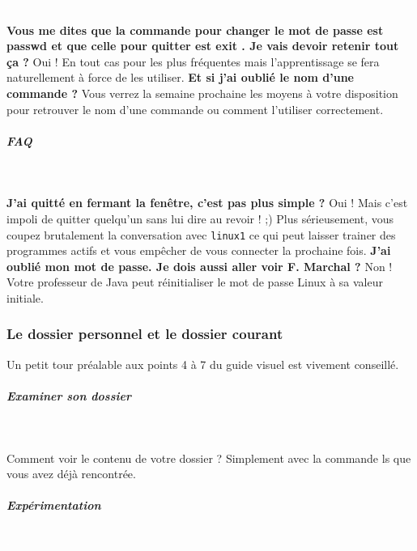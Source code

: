\documentclass[11pt,a4paper]{article}
\begin{document}
					\textcolor{white}{.} \par
				
            \par
         \textbf{Vous me dites que la commande pour changer le mot de passe est passwd  et que celle pour quitter est exit . Je vais devoir retenir tout \c ca ?} 
Oui ! En tout cas pour les plus fr\'equentes mais l'apprentissage se fera naturellement \`a force de les utiliser.
 \textbf{Et si j'ai oubli\'e le nom d'une commande ?} 
Vous verrez la semaine prochaine les moyens \`a votre disposition pour retrouver le nom d'une commande ou comment l'utiliser correctement. 

			
		\subparagraph{FAQ} 
		
					\textcolor{white}{.} \par
				
            \par
         \textbf{J'ai quitt\'e en fermant la fen\^etre, c'est pas plus simple ?} 
Oui ! Mais c'est impoli de quitter quelqu'un sans lui dire au revoir !
;) Plus s\'erieusement, vous coupez brutalement la conversation avec
 \texttt{linux1}  ce qui peut laisser trainer des programmes actifs et vous emp\^echer de
vous connecter la prochaine fois.
 \textbf{J'ai oubli\'e mon mot de passe. Je dois aussi aller voir F. Marchal ?} 
Non ! Votre professeur de Java peut r\'einitialiser le mot de passe Linux \`a sa valeur initiale.

			
		\subsubsection{Le dossier personnel et le dossier courant} 
		\label{TD1TD1learningObject6.tex}
			
Un petit tour pr\'ealable aux points 4 \`a 7 du guide visuel est vivement conseill\'e.

			
		\subparagraph{Examiner son dossier} 
		
					\textcolor{white}{.} \par
				
            \par
        
Comment voir le contenu de votre dossier ? Simplement avec la commande ls  que vous avez d\'ej\`a rencontr\'ee.

			
		\subparagraph{Exp\'erimentation} 
		
					\textcolor{white}{.} \par
				
            \par
        
\end{document}
